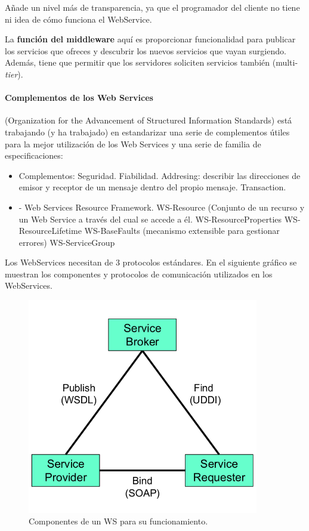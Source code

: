 \documentclass{apuntes}[nochap]
\begin{document}
Añade un nivel más de transparencia, ya que el programador del cliente no tiene ni idea de cómo funciona el WebService.

La \textbf{función del middleware} aquí es proporcionar funcionalidad para publicar los servicios que ofreces y descubrir los nuevos servicios que vayan surgiendo. Además, tiene que permitir que los servidores soliciten servicios también (multi-\textit{tier}).

\paragraph{Complementos de los Web Services}  (Organization for the Advancement of Structured Information Standards) está trabajando (y ha trabajado) en estandarizar una serie de complementos útiles para la mejor utilización de los Web Services y una serie de familia de especificaciones:
\begin{itemize}
\item Complementos:
	\subitem Seguridad.
	\subitem Fiabilidad.
	\subitem Addresing: describir las direcciones de emisor y receptor de un mensaje dentro del propio mensaje.
	\subitem Transaction.
\item {} - Web Services Resource Framework.
	\subitem WS-Resource (Conjunto de un recurso y un Web Service a través del cual se accede a él.
	\subitem WS-ResourceProperties
	\subitem WS-ResourceLifetime
	\subitem WS-BaseFaults (mecanismo extensible para gestionar errores)
	\subitem WS-ServiceGroup
\end{itemize}

Los WebServices necesitan de 3 protocolos estándares. En el siguiente gráfico se muestran los componentes y protocolos de comunicación utilizados en los WebServices.


\begin{figure}[htb]
\centering
\includegraphics[width=0.9\textwidth]{img/WS.png}
\caption{Componentes de un WS para su funcionamiento.}
\label{WSimg}
\end{figure}
\end{document}
